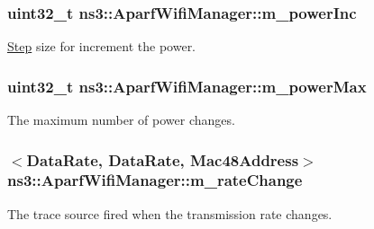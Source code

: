 \subsubsection[{\texorpdfstring{m\+\_\+power\+Inc}{m_powerInc}}]{\setlength{\rightskip}{0pt plus 5cm}uint32\+\_\+t ns3\+::\+Aparf\+Wifi\+Manager\+::m\+\_\+power\+Inc\hspace{0.3cm}{\ttfamily [private]}}\hypertarget{classns3_1_1AparfWifiManager_aa9276b0b5e0bfdf2b9d81e2c2a46f6a3}{}\label{classns3_1_1AparfWifiManager_aa9276b0b5e0bfdf2b9d81e2c2a46f6a3}


\hyperlink{structStep}{Step} size for increment the power. 

\subsubsection[{\texorpdfstring{m\+\_\+power\+Max}{m_powerMax}}]{\setlength{\rightskip}{0pt plus 5cm}uint32\+\_\+t ns3\+::\+Aparf\+Wifi\+Manager\+::m\+\_\+power\+Max\hspace{0.3cm}{\ttfamily [private]}}\hypertarget{classns3_1_1AparfWifiManager_a4879816bad5b15bfadc1326a3b636477}{}\label{classns3_1_1AparfWifiManager_a4879816bad5b15bfadc1326a3b636477}


The maximum number of power changes. 

\subsubsection[{\texorpdfstring{m\+\_\+rate\+Change}{m_rateChange}}]{$<${\bf Data\+Rate}, {\bf Data\+Rate}, {\bf Mac48\+Address}$>$ ns3\+::\+Aparf\+Wifi\+Manager\+::m\+\_\+rate\+Change\hspace{0.3cm}{\ttfamily [private]}}\hypertarget{classns3_1_1AparfWifiManager_af4fc339c43403d3dbbf6d547d5342af3}{}\label{classns3_1_1AparfWifiManager_af4fc339c43403d3dbbf6d547d5342af3}
The trace source fired when the transmission rate changes. 
